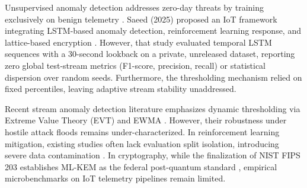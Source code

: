 \documentclass{ieeeaccess}
\begin{document}
Unsupervised anomaly detection addresses zero-day threats by training exclusively on benign telemetry \cite{chandola2009,zong2018}. Saeed (2025) proposed an IoT framework integrating LSTM-based anomaly detection, reinforcement learning response, and lattice-based encryption \cite{saeed2025}. However, that study evaluated temporal LSTM sequences with a 30-second lookback on a private, unreleased dataset, reporting zero global test-stream metrics (F1-score, precision, recall) or statistical dispersion over random seeds. Furthermore, the thresholding mechanism relied on fixed percentiles, leaving adaptive stream stability unaddressed.

Recent stream anomaly detection literature emphasizes dynamic thresholding via Extreme Value Theory (EVT) and EWMA \cite{siffer2017,ding2019}. However, their robustness under hostile attack floods remains under-characterized. In reinforcement learning mitigation, existing studies often lack evaluation split isolation, introducing severe data contamination \cite{dulac2019,kavousi2024}. In cryptography, while the finalization of NIST FIPS 203 establishes ML-KEM as the federal post-quantum standard \cite{nist2024fips203}, empirical microbenchmarks on IoT telemetry pipelines remain limited.
\end{document}
